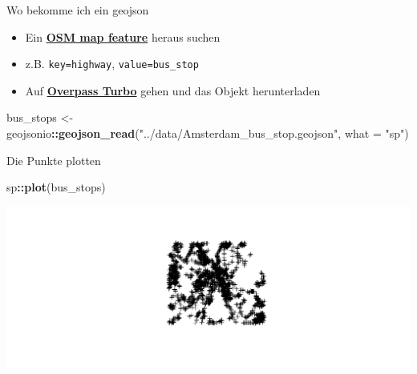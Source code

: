 \documentclass[ignorenonframetext,]{beamer}
\newenvironment{Shaded}{\begin{snugshade}}{\end{snugshade}}
\newcommand{\KeywordTok}[1]{\textcolor[rgb]{0.13,0.29,0.53}{\textbf{#1}}}
\newcommand{\DataTypeTok}[1]{\textcolor[rgb]{0.13,0.29,0.53}{#1}}
\newcommand{\StringTok}[1]{\textcolor[rgb]{0.31,0.60,0.02}{#1}}
\newcommand{\OperatorTok}[1]{\textcolor[rgb]{0.81,0.36,0.00}{\textbf{#1}}}
\newcommand{\NormalTok}[1]{#1}
\providecommand{\tightlist}{%
  \setlength{\itemsep}{0pt}\setlength{\parskip}{0pt}}
\begin{document}
\begin{frame}[fragile]{Wo bekomme ich ein geojson}

\begin{itemize}
\tightlist
\item
  Ein
  \href{https://wiki.openstreetmap.org/wiki/Map_Features}{\textbf{OSM
  map feature}} heraus suchen
\item
  z.B. \texttt{key=highway}, \texttt{value=bus\_stop}
\item
  Auf \href{https://overpass-turbo.eu/}{\textbf{Overpass Turbo}} gehen
  und das Objekt herunterladen
\end{itemize}

\begin{Shaded}
\begin{Highlighting}[]
\NormalTok{bus_stops <-}\StringTok{ }\NormalTok{geojsonio}\OperatorTok{::}\KeywordTok{geojson_read}\NormalTok{(}\StringTok{"../data/Amsterdam_bus_stop.geojson"}\NormalTok{,}
  \DataTypeTok{what =} \StringTok{"sp"}\NormalTok{)}
\end{Highlighting}
\end{Shaded}

\end{frame}

\begin{frame}[fragile]{Die Punkte plotten}

\begin{Shaded}
\begin{Highlighting}[]
\NormalTok{sp}\OperatorTok{::}\KeywordTok{plot}\NormalTok{(bus_stops)}
\end{Highlighting}
\end{Shaded}

\includegraphics{slides_all2gether_part2_files/figure-beamer/unnamed-chunk-168-1.pdf}

\end{frame}
\end{document}
